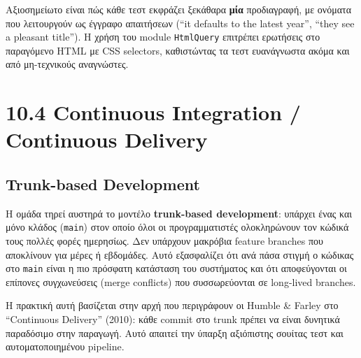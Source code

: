 \begin{Shaded}
\begin{Highlighting}[]
\NormalTok{, \%}\FunctionTok{\{}\FunctionTok{\}} 
      \FunctionTok{\{}\FunctionTok{\}} \OperatorTok{=}\FunctionTok{(}\OperatorTok{\textasciitilde{}}\FunctionTok{)}
\OperatorTok{=}\FunctionTok{(}\FunctionTok{)} \OperatorTok{|\textgreater{}}\FunctionTok{()}
\end{Highlighting}
\end{Shaded}

Αξιοσημείωτο είναι πώς κάθε τεστ εκφράζει ξεκάθαρα \textbf{μία}
προδιαγραφή, με ονόματα που λειτουργούν ως έγγραφο απαιτήσεων (``it
defaults to the latest year'', ``they see a pleasant title''). Η χρήση
του module \texttt{HtmlQuery} επιτρέπει ερωτήσεις στο παραγόμενο HTML με
CSS selectors, καθιστώντας τα τεστ ευανάγνωστα ακόμα και από
μη-τεχνικούς αναγνώστες.

\section{10.4 Continuous Integration / Continuous
Delivery}\label{continuous-integration-continuous-delivery}

\subsection{Trunk-based Development}\label{trunk-based-development}

Η ομάδα τηρεί αυστηρά το μοντέλο \textbf{trunk-based development}:
υπάρχει ένας και μόνο κλάδος (\texttt{main}) στον οποίο όλοι οι
προγραμματιστές ολοκληρώνουν τον κώδικά τους πολλές φορές ημερησίως. Δεν
υπάρχουν μακρόβια feature branches που αποκλίνουν για μέρες ή εβδομάδες.
Αυτό εξασφαλίζει ότι ανά πάσα στιγμή ο κώδικας στο \texttt{main} είναι η
πιο πρόσφατη κατάσταση του συστήματος και ότι αποφεύγονται οι επίπονες
συγχωνεύσεις (merge conflicts) που συσσωρεύονται σε long-lived branches.

Η πρακτική αυτή βασίζεται στην αρχή που περιγράφουν οι Humble \& Farley
στο ``Continuous Delivery'' (2010): κάθε commit στο trunk πρέπει να
είναι δυνητικά παραδόσιμο στην παραγωγή. Αυτό απαιτεί την ύπαρξη
αξιόπιστης σουίτας τεστ και αυτοματοποιημένου pipeline.

